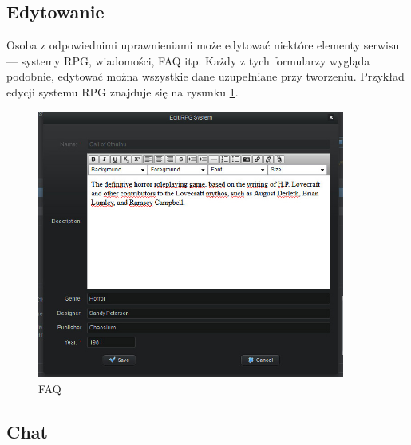 \subsection{Edytowanie}
\label{sec:edit}
Osoba z odpowiednimi uprawnieniami może edytować niektóre elementy serwisu --- systemy RPG, wiadomości, FAQ itp. Każdy z tych formularzy wygląda podobnie, edytować można wszystkie dane uzupełniane przy tworzeniu. Przykład edycji systemu RPG znajduje się na rysunku \ref{fig:edit}.

\begin{figure}[h!]	
\centering
\includegraphics[width=0.9\textwidth]{./img/interfejsy/edit}
\caption{FAQ}
\label{fig:edit}
\end{figure}

\subsection{Chat}
\label{sec:chat}

